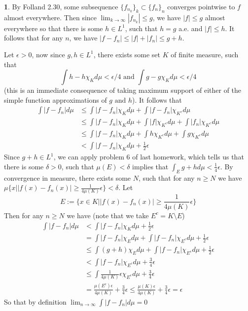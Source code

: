 \documentclass[10.5pt]{article}
\theoremstyle{definition}
\newtheorem{pb}{}
\newcommand{\set}[1]{\{#1\}}
\newcommand{\abs}[1]{\left\vert#1\right\vert}
\newcommand{\tand}{\text{ and }}
\begin{document}
    \begin{pb}
        By Folland 2.30, some subsequence \(\set{f_{n_k}}_k \subset \set{f_n}_n\) converges pointwise to \(f\) almost everywhere. Then since
        \(\lim_{k\to \infty}\abs{f_{n_k}}  \leq g\), we have \(\abs{f} \leq g\) almost everywhere so that there is some \(h \in L^1\), such that \(h = g\) a.e. and \(\abs{f} \leq h\).
        It follows that for any \(n\), we have \(\abs{f - f_n} \leq \abs{f} + \abs{f_n} \leq g + h\).

        Let \(\epsilon > 0\), now since \(g, h \in L^1\), there exists some set \(K\) of finite measure, such that 
        \[\int h - h\chi_K d\mu < \epsilon/4 \tand \int g - g\chi_K d\mu < \epsilon/4\]
        (this is an immediate consequence of taking maximum support of either of the simple function approximations of \(g \tand h\)).
        It follows that
        \begin{align*}
            \int\abs{f - f_n}d\mu &\leq \int \abs{f-f_n}\chi_Kd\mu + \int \abs{f - f_n}\chi_{K^c}d\mu \\
            &\leq \int \abs{f-f_n}\chi_Kd\mu + \int \abs{f}\chi_{K^c}d\mu + \int\abs{f_n}\chi_{K^c}d\mu \\
            &\leq \int \abs{f-f_n}\chi_Kd\mu + \int h\chi_{K^c}d\mu + \int g\chi_{K^c}d\mu \\
            &< \int \abs{f-f_n}\chi_Kd\mu + \frac{1}{2}\epsilon
        \end{align*}
        Since \(g + h \in L^1\), we can apply problem 6 of last homework, which tells us that there is some \(\delta > 0\), such that \(\mu(E) < \delta\) implies that
        \(\int_E g+h d\mu < \frac{1}{4}\epsilon\). By convergence in measure, there exists some \(N\), such that for any \(n \geq N\) we have 
        \(\mu\set{x \vert \abs{f(x) - f_n(x)} \geq \frac{1}{4 \mu(K)}\epsilon} < \delta\). 
        Let \[E := \set{x \in K \vert \abs{f(x) - f_n(x)} \geq \frac{1}{4 \mu(K)}\epsilon}\]
        Then for any \(n \geq N\) we have (note that we take \(E^c = K \setminus E\))
        \begin{align*}
            \int \abs{f-f_n}d\mu &< \int \abs{f - f_n}\chi_K d\mu + \frac{1}{2}\epsilon \\
            &= \int \abs{f - f_n}\chi_E d\mu + \int \abs{f - f_n}\chi_{E^c} d\mu + \frac{1}{2}\epsilon \\
            &\leq \int (g + h)\chi_E d\mu + \int \abs{f - f_n}\chi_{E^c} d\mu + \frac{1}{2}\epsilon \\
            &< \int \abs{f - f_n}\chi_{E^c} d\mu + \frac{3}{4}\epsilon \\
            &\leq \int \frac{1}{4 \mu(K)}\epsilon \chi_{E^c}d\mu + \frac{3}{4}\epsilon \\
            &= \frac{\mu(E^c)\epsilon}{4 \mu(K)} + \frac{3}{4}\epsilon \leq \frac{\mu(K)\epsilon}{4 \mu(K)} + \frac{3}{4}\epsilon = \epsilon
        \end{align*}
        So that by definition \(\lim_{n\to\infty}\int \abs{f - f_n}d\mu = 0\)
    \end{pb}
\end{document}
